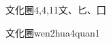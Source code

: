 \begin{entry}{文化圈}{4,4,11}{⽂、⼔、⼞}
  \begin{phonetics}{文化圈}{wen2hua4quan1}
  \end{phonetics}
\end{entry}
